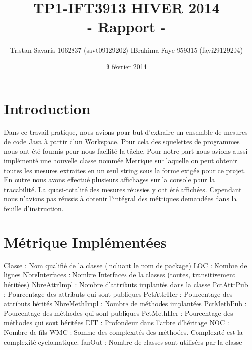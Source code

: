 \documentclass[11pt, french]{article} %
\title{TP1-IFT3913 HIVER 2014\\- Rapport -}
\author{Tristan Savaria 1062837 (savt09129202) IBrahima Faye 959315 (fayi29129204)}
\date{9 février 2014}
\begin{document}
\maketitle
\newpage
\tableofcontents
\newpage
\section{Introduction}
\paragraph{}
Dans ce travail pratique, nous avions pour but d'extraire un ensemble de mesures de code Java à partir d'un Workspace.
Pour cela des squelettes de programmes nous ont été fournis pour nous facilité la tâche.
Pour notre part nous avions aussi implémenté une nouvelle classe nommée Metrique sur laquelle on peut
obtenir toutes les mesures extraites en un seul string sous la forme exigée pour ce projet. En outre nous avons effectué 
plusieurs affichages sur la console pour la tracabilité. La quasi-totalité des mesures réussies y ont été affichées.
Cependant nous n'avions pas réussis à obtenir l'intégral des métriques demandées dans la feuille d'instruction.

\section{Métrique Implémentées}
Classe : Nom qualifié de la classe (incluant le nom de package)
\newline
LOC : Nombre de lignes
\newline
NbreInterfaces : Nombre Interfaces de la classes (toutes, transitivement héritées)
\newline
NbreAttrImpl : Nombre d'attributs implantés dans la classe
\newline
PctAttrPub : Pourcentage des attributs qui sont publiques
\newline
PctAttrHer : Pourcentage des attributs hérités
\newline
NbreMethImpl : Nombre de méthodes implantées
\newline
PctMethPub : Pourcentage des méthodes qui sont publiques
\newline
PctMethHer : Pourcentage des méthodes qui sont héritées
\newline
DIT : Profondeur dans l'arbre d'héritage
\newline
NOC : Nombre de fils
\newline
WMC : Somme des complexités des méthodes. Complexité est la complexité cyclomatique.
\newline
fanOut : Nombre de classes sont utilisées par la classe
\newline
\end{document}
